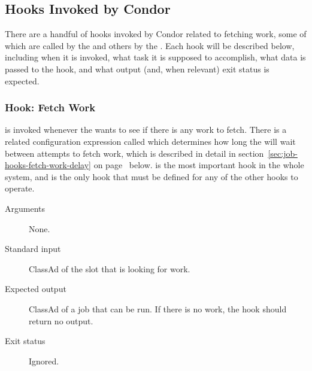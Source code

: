 \subsection{\label{sec:job-hooks-hooks}
Hooks Invoked by Condor}

There are a handful of hooks invoked by Condor related to fetching
work, some of which are called by the  and others by
the .
Each hook will be described below, including when it is invoked, what
task it is supposed to accomplish, what data is passed to the hook,
and what output (and, when relevant) exit status is expected.


\subsubsection{\label{sec:job-hooks-fetch-work}
Hook: Fetch Work}

 is invoked whenever the 
wants to see if there is any work to fetch.
There is a related configuration expression called
 which determines how long the 
will wait between attempts to fetch work, which is described in detail
in section~\ref{sec:job-hooks-fetch-work-delay} on
page~\pageref{sec:job-hooks-fetch-work-delay} below.
 is the most important hook in the whole
system, and is the only hook that must be defined for any of the other
 hooks to operate.

\begin{description}
\item[Arguments]
  None.

\item[Standard input]
  ClassAd of the slot that is looking for work.

\item[Expected output]
  ClassAd of a job that can be run.
  If there is no work, the hook should return no output.

\item[Exit status]
  Ignored.
\end{description}

